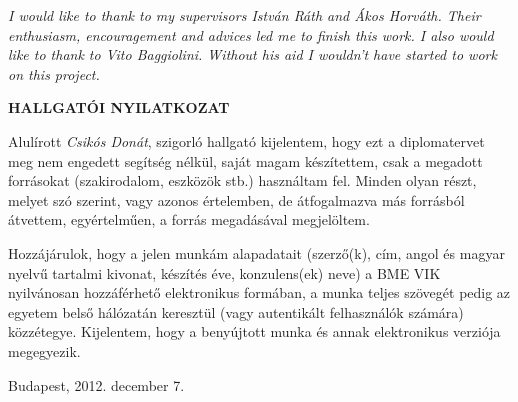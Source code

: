\emph{I would like to thank to my supervisors István Ráth and Ákos Horváth. Their
enthusiasm, encouragement and advices led me to finish this work. I also would
like to thank to Vito Baggiolini. Without his aid I wouldn’t have started to
work on this project.}
\vfill 
\clearpage


\begin{center} 
\large
\textbf{HALLGATÓI NYILATKOZAT}\\
\end{center}

Alulírott \emph{Csikós Donát}, szigorló hallgató kijelentem, hogy ezt a
diplomatervet meg nem  engedett segítség
nélkül, saját magam készítettem, csak a megadott forrásokat (szakirodalom,
eszközök stb.) használtam fel. Minden olyan részt, melyet szó szerint, vagy
azonos értelemben, de átfogalmazva más forrásból átvettem, egyértelműen, a
forrás megadásával megjelöltem.

Hozzájárulok, hogy a jelen munkám alapadatait (szerző(k), cím, angol és magyar
nyel\-vű tartalmi kivonat, készítés éve, konzulens(ek) neve) a BME VIK
nyilvánosan hozzáférhető elektronikus formában, a munka teljes szövegét pedig
az egyetem belső hálózatán keresztül (vagy autentikált felhasználók számára)
közzétegye. Kijelentem, hogy a benyújtott munka és annak elektronikus verziója
megegyezik.

\begin{flushleft}
\vspace*{1cm}
Budapest, 2012. december 7.
\end{flushleft}

\begin{flushright}
 \vspace*{1cm}
 \makebox[7cm]{\rule{6cm}{.4pt}}\\
 \\
\end{flushright}
\thispagestyle{empty}

\vfill
\clearpage
\thispagestyle{empty} %